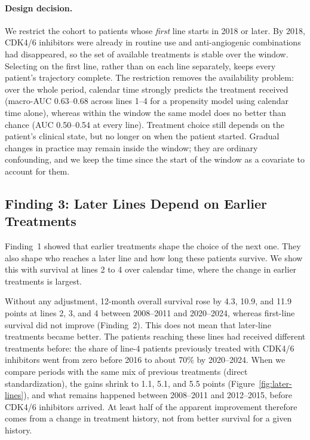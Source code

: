 \documentclass[a4paper,10pt]{article}
\begin{document}
\paragraph{Design decision.} We restrict the cohort to patients whose \emph{first} line starts in 2018 or later. By 2018, CDK4/6 inhibitors were already in routine use and anti-angiogenic combinations had disappeared, so the set of available treatments is stable over the window. Selecting on the first line, rather than on each line separately, keeps every patient's trajectory complete. The restriction removes the availability problem: over the whole period, calendar time strongly predicts the treatment received (macro-AUC 0.63--0.68 across lines 1--4 for a propensity model using calendar time alone), whereas within the window the same model does no better than chance (AUC 0.50--0.54 at every line). Treatment choice still depends on the patient's clinical state, but no longer on when the patient started. Gradual changes in practice may remain inside the window; they are ordinary confounding, and we keep the time since the start of the window as a covariate to account for them.

\subsection{Finding 3: Later Lines Depend on Earlier Treatments}

Finding~1 showed that earlier treatments shape the choice of the next one. They also shape who reaches a later line and how long these patients survive. We show this with survival at lines 2 to 4 over calendar time, where the change in earlier treatments is largest.

Without any adjustment, 12-month overall survival rose by 4.3, 10.9, and 11.9 points at lines 2, 3, and 4 between 2008--2011 and 2020--2024, whereas first-line survival did not improve (Finding~2). This does not mean that later-line treatments became better. The patients reaching these lines had received different treatments before: the share of line-4 patients previously treated with CDK4/6 inhibitors went from zero before 2016 to about 70\% by 2020--2024. When we compare periods with the same mix of previous treatments (direct standardization), the gains shrink to 1.1, 5.1, and 5.5 points (Figure~\ref{fig:later-lines}), and what remains happened between 2008--2011 and 2012--2015, before CDK4/6 inhibitors arrived. At least half of the apparent improvement therefore comes from a change in treatment history, not from better survival for a given history.
\end{document}
